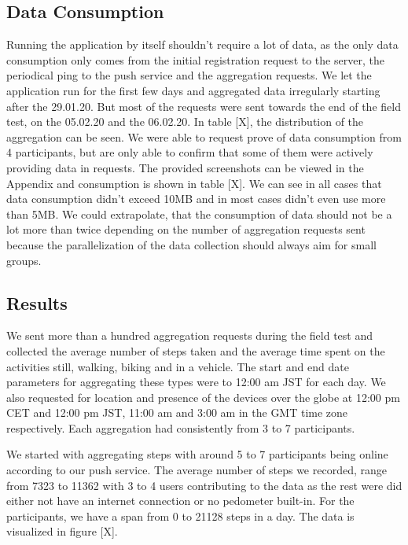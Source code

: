 \subsection{Data Consumption}
Running the application by itself shouldn't require a lot of data, as the only data consumption only comes from the initial registration request to the server, the periodical ping to the push service and the aggregation requests. We let the application run for the first few days and aggregated data irregularly starting after the 29.01.20. But most of the requests were sent towards the end of the field test, on the 05.02.20 and the 06.02.20. In table [X], the distribution of the aggregation can be seen. We were able to request prove of data consumption from 4 participants, but are only able to confirm that some of them were actively providing data in requests. The provided screenshots can be viewed in the Appendix and consumption is shown in table [X]. 
We can see in all cases that data consumption didn't exceed 10MB and in most cases didn't even use more than 5MB. We could extrapolate, that the consumption of data should not be a lot more than twice depending on the number of aggregation requests sent because the parallelization of the data collection should always aim for small groups.

\subsection{Results}
We sent more than a hundred aggregation requests during the field test and collected the average number of steps taken and the average time spent on the activities still, walking, biking and in a vehicle. The start and end date parameters for aggregating these types were to 12:00 am JST for each day. We also requested for location and presence of the devices over the globe at 12:00 pm CET and 12:00 pm JST, 11:00 am and 3:00 am in the GMT time zone respectively. Each aggregation had consistently from 3 to 7 participants.

We started with aggregating steps with around 5 to 7 participants being online according to our push service. The average number of steps we recorded, range from 7323 to 11362 with 3 to 4 users contributing to the data as the rest were did either not have an internet connection or no pedometer built-in. For the participants, we have a span from 0 to 21128 steps in a day. The data is visualized in figure [X].

